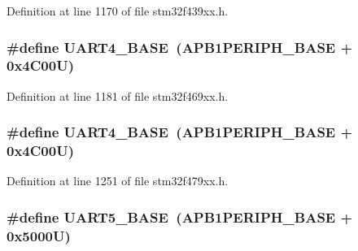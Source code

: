 Definition at line 1170 of file stm32f439xx.\+h.

\subsubsection[{\texorpdfstring{U\+A\+R\+T4\+\_\+\+B\+A\+SE}{UART4_BASE}}]{\setlength{\rightskip}{0pt plus 5cm}\#define U\+A\+R\+T4\+\_\+\+B\+A\+SE~({\bf A\+P\+B1\+P\+E\+R\+I\+P\+H\+\_\+\+B\+A\+SE} + 0x4\+C00\+U)}\hypertarget{group___peripheral__memory__map_ga94d92270bf587ccdc3a37a5bb5d20467}{}\label{group___peripheral__memory__map_ga94d92270bf587ccdc3a37a5bb5d20467}


Definition at line 1181 of file stm32f469xx.\+h.

\subsubsection[{\texorpdfstring{U\+A\+R\+T4\+\_\+\+B\+A\+SE}{UART4_BASE}}]{\setlength{\rightskip}{0pt plus 5cm}\#define U\+A\+R\+T4\+\_\+\+B\+A\+SE~({\bf A\+P\+B1\+P\+E\+R\+I\+P\+H\+\_\+\+B\+A\+SE} + 0x4\+C00\+U)}\hypertarget{group___peripheral__memory__map_ga94d92270bf587ccdc3a37a5bb5d20467}{}\label{group___peripheral__memory__map_ga94d92270bf587ccdc3a37a5bb5d20467}


Definition at line 1251 of file stm32f479xx.\+h.

\subsubsection[{\texorpdfstring{U\+A\+R\+T5\+\_\+\+B\+A\+SE}{UART5_BASE}}]{\setlength{\rightskip}{0pt plus 5cm}\#define U\+A\+R\+T5\+\_\+\+B\+A\+SE~({\bf A\+P\+B1\+P\+E\+R\+I\+P\+H\+\_\+\+B\+A\+SE} + 0x5000\+U)}\hypertarget{group___peripheral__memory__map_gaa155689c0e206e6994951dc3cf31052a}{}\label{group___peripheral__memory__map_gaa155689c0e206e6994951dc3cf31052a}


